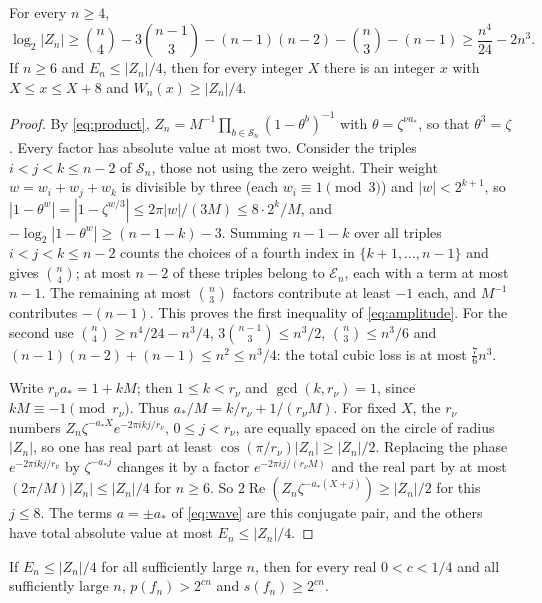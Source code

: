 \begin{proposition}\label{prop:amplitude}
For every $n\ge4$,
\begin{equation}\label{eq:amplitude}
 \log_2|Z_n|\ge\binom n4-3\binom{n-1}3-(n-1)(n-2)-\binom n3-(n-1)
 \ge\frac{n^4}{24}-2n^3 .
\end{equation}
If $n\ge6$ and $E_n\le|Z_n|/4$, then for every integer $X$ there is an integer
$x$ with $X\le x\le X+8$ and $W_n(x)\ge|Z_n|/4$.
\end{proposition}

\begin{proof}
By \eqref{eq:product}, $Z_n=M^{-1}\prod_{b\in\mathcal S_n}(1-\theta^b)^{-1}$ with
$\theta=\zeta^{\nu a_*}$, so that $\theta^3=\zeta$. Every factor has absolute
value at most two. Consider the triples $i<j<k\le n-2$ of $\mathcal S_n$, those
not using the zero weight. Their weight $w=w_i+w_j+w_k$ is divisible by three
(each $w_i\equiv1\pmod3$) and $|w|<2^{k+1}$, so
$|1-\theta^w|=|1-\zeta^{w/3}|\le2\pi|w|/(3M)\le8\cdot2^k/M$, and
$-\log_2|1-\theta^w|\ge(n-1-k)-3$. Summing $n-1-k$ over all triples
$i<j<k\le n-2$ counts the choices of a fourth index in $\{k+1,\dots,n-1\}$ and
gives $\binom n4$; at most $n-2$ of these triples belong to $\mathcal E_n$, each
with a term at most $n-1$. The remaining at most $\binom n3$ factors contribute
at least $-1$ each, and $M^{-1}$ contributes $-(n-1)$. This proves the first
inequality of \eqref{eq:amplitude}. For the second use $\binom n4\ge
n^4/24-n^3/4$, $3\binom{n-1}3\le n^3/2$, $\binom n3\le n^3/6$ and
$(n-1)(n-2)+(n-1)\le n^2\le n^3/4$: the total cubic loss is at most
$\tfrac76n^3$.

Write $r_\nu a_*=1+kM$; then $1\le k<r_\nu$ and $\gcd(k,r_\nu)=1$, since
$kM\equiv-1\pmod{r_\nu}$. Thus $a_*/M=k/r_\nu+1/(r_\nu M)$. For fixed $X$, the
$r_\nu$ numbers $Z_n\zeta^{-a_*X}e^{-2\pi ikj/r_\nu}$, $0\le j<r_\nu$, are
equally spaced on the circle of radius $|Z_n|$, so one has real part at least
$\cos(\pi/r_\nu)|Z_n|\ge|Z_n|/2$. Replacing the phase $e^{-2\pi ikj/r_\nu}$ by
$\zeta^{-a_*j}$ changes it by a factor $e^{-2\pi ij/(r_\nu M)}$ and the real
part by at most $(2\pi/M)|Z_n|\le|Z_n|/4$ for $n\ge6$. So
$2\operatorname{Re}(Z_n\zeta^{-a_*(X+j)})\ge|Z_n|/2$ for this $j\le8$. The terms
$a=\pm a_*$ of \eqref{eq:wave} are this conjugate pair, and the others have
total absolute value at most $E_n\le|Z_n|/4$.
\end{proof}

\begin{corollary}\label{cor:conditional}
If $E_n\le|Z_n|/4$ for all sufficiently large $n$, then for every real
$0<c<1/4$ and all sufficiently large $n$, $p(f_n)>2^{cn}$ and $s(f_n)\ge2^{cn}$.
\end{corollary}

